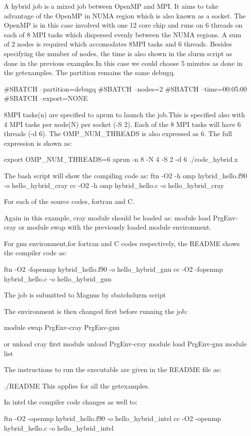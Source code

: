 \documentclass[journal]{IEEEtran}
\begin{document}
A hybrid job is a mixed job between OpenMP and MPI. It aims to take advantage of the OpenMP in NUMA region which is also known as a socket.
The OpenMP is in this case involved with one 12 core chip and runs on 6 threads on each of 8 MPI tasks which dispersed evenly between the NUMA regions.
A sum of 2 nodes is required which accomodates 8MPI tasks and 6 threads.
Besides specifying the number of nodes, the time is also shown in the slurm script as done in the previous examples.In this case we could choose 5 minutes as done in the getexamples.
The partition remains the same debugq.

#SBATCH --partition=debugq
#SBATCH --nodes=2
#SBATCH --time=00:05:00
#SBATCH --export=NONE

8MPI tasks(n) are specified to aprun to launch the job.This is specified also with 4 MPI tasks per node(N) per socket (-S 2).
Each of the 8 MPI tasks will have 6 threads (-d 6). The OMP_NUM_THREADS is also expressed as 6.
The full expression is shown as:

export OMP_NUM_THREADS=6
aprun -n 8 -N 4 -S 2 -d 6 ./code_hybrid.x

The bash script will show the compiling code as:
ftn -O2 -h omp hybrid_hello.f90 -o hello_hybrid_cray
cc -O2 -h omp hybrid_hello.c -o hello_hybrid_cray

For each of the source codes, fortran and C.

Again in this example, cray module should be loaded as:
module load PrgEnv-cray or module swap with the previously loaded module environment.

For gnu environment,for fortran and C codes respectively, the README shows the compiler code as:

ftn -O2 -fopenmp hybrid_hello.f90 -o hello_hybrid_gnu
cc -O2 -fopenmp hybrid_hello.c -o hello_hybrid_gnu

The job is submitted to Magnus by sbatch{slurm script}

The environment is then changed first before running the job:

module swap PrgEnv-cray PrgEnv-gnu

or unload cray first
module unload PrgEnv-cray
module load PrgEnv-gnu
module list

The instructions to run the executable are given in the README  file as:

./README 
This applies for all the getexamples.

In intel the compiler code changes as well to:

ftn -O2 -openmp hybrid_hello.f90 -o hello_hybrid_intel
cc -O2 -openmp hybrid_hello.c -o hello_hybrid_intel
\end{document}
